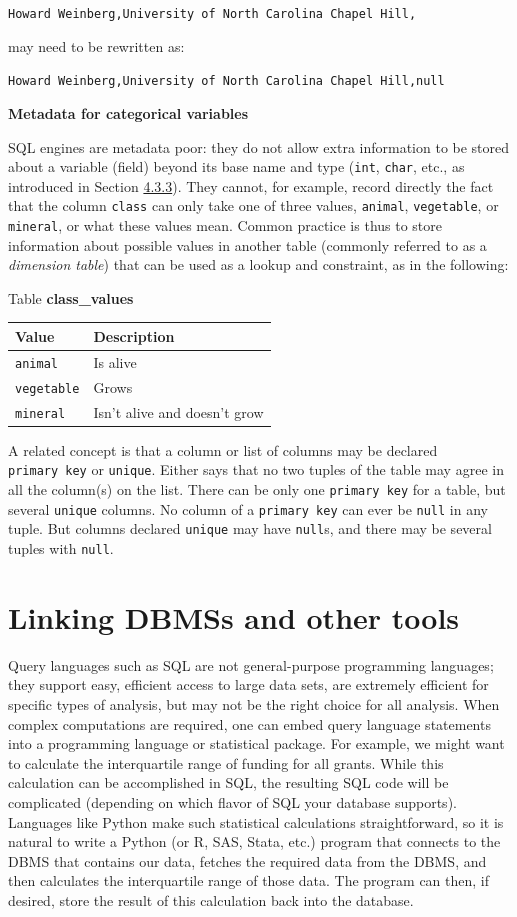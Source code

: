 \documentclass[]{krantz}
\begin{document}
\texttt{Howard\ Weinberg,University\ of\ North\ Carolina\ Chapel\ Hill,}

may need to be rewritten as:

\texttt{Howard\ Weinberg,University\ of\ North\ Carolina\ Chapel\ Hill,null}

\textbf{Metadata for categorical variables}

SQL engines are metadata poor: they do not allow extra information to be
stored about a variable (field) beyond its base name and type
(\texttt{int}, \texttt{char}, etc., as introduced in Section
\protect\hyperlink{sec:db:schema}{4.3.3}). They cannot, for example,
record directly the fact that the column \texttt{class} can only take
one of three values, \texttt{animal}, \texttt{vegetable}, or
\texttt{mineral}, or what these values mean. Common practice is thus to
store information about possible values in another table (commonly
referred to as a \emph{dimension table}) that can be used as a lookup
and constraint, as in the following:

Table \textbf{class\_values}

\begin{longtable}[]{@{}ll@{}}
\toprule
\textbf{Value} & \textbf{Description}\tabularnewline
\midrule
\endhead
\texttt{animal} & Is alive\tabularnewline
\texttt{vegetable} & Grows\tabularnewline
\texttt{mineral} & Isn't alive and doesn't grow\tabularnewline
\bottomrule
\end{longtable}

A related concept is that a column or list of columns may be declared
\texttt{primary\ key} or \texttt{unique}. Either says that no two tuples
of the table may agree in all the column(s) on the list. There can be
only one \texttt{primary\ key} for a table, but several \texttt{unique}
columns. No column of a \texttt{primary\ key} can ever be \texttt{null}
in any tuple. But columns declared \texttt{unique} may have
\texttt{null}s, and there may be several tuples with \texttt{null}.

\section{Linking DBMSs and other
tools}\label{linking-dbmss-and-other-tools}

Query languages such as SQL are not general-purpose programming
languages; they support easy, efficient access to large data sets, are
extremely efficient for specific types of analysis, but may not be the
right choice for all analysis. When complex computations are required,
one can embed query language statements into a programming language or
statistical package. For example, we might want to calculate the
interquartile range of funding for all grants. While this calculation
can be accomplished in SQL, the resulting SQL code will be complicated
(depending on which flavor of SQL your database supports). Languages
like Python make such statistical calculations straightforward, so it is
natural to write a Python (or R, SAS, Stata, etc.) program that connects
to the DBMS that contains our data, fetches the required data from the
DBMS, and then calculates the interquartile range of those data. The
program can then, if desired, store the result of this calculation back
into the database.
\end{document}
